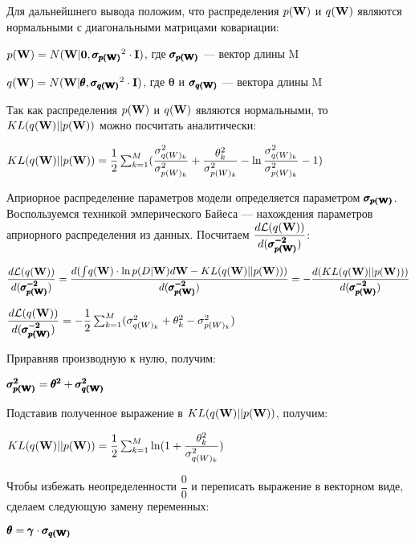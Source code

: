 \documentclass{article}
\begin{document}
Для дальнейшнего вывода положим, что распределения $p(\bold{W})$ и $q(\bold{W})$ являются нормальными с диагональными матрицами ковариации:

$p(\bold{W}) = N(\bold{W} | \bold{0}, \pmb{\sigma_{p(\bold{W})}}^{2} \cdot \bold{I})$, где $\pmb{\sigma_{p(\bold{W})}}$ — вектор длины M

$q(\bold{W}) = N(\bold{W} | \pmb{\theta}, \pmb{\sigma_{q(\bold{W})}}^{2} \cdot \bold{I})$, где $\pmb{\theta}$ и $\pmb{\sigma_{q(\bold{W})}}$ — вектора длины M

Так как распределения $p(\bold{W})$ и $q(\bold{W})$ являются нормальными, то $KL(q(\bold{W}) || p(\bold{W}))$ можно посчитать аналитически:

$
KL(q(\bold{W}) || p(\bold{W})) = 
\dfrac{1}{2}\sum_{k=1}^{M}(\dfrac{\sigma_{{q(W)_{k}}}^2}{\sigma_{{p(W)_{k}}}^2} + \dfrac{\theta_{k}^2}{\sigma_{{p(W)_{k}}}^2} - \ln{\dfrac{\sigma_{{q(W)_{k}}}^2}{\sigma_{{p(W)_{k}}}^2}} - 1)
$

Априорное распределение параметров модели определяется параметром $\pmb{\sigma_{p(\bold{W})}}$. Воспользуемся техникой эмперического Байеса — нахождения параметров априорного распределения из данных. Посчитаем
$\dfrac{d\mathcal{L}(q(\bold{W}))}{d ({\pmb{\sigma_{p(\bold{W})}^{-2}}})}$:

$
\dfrac{d\mathcal{L}(q(\bold{W}))}{d ({\pmb{\sigma_{p(\bold{W})}^{-2}}})} =
\dfrac{d (\int_{}{} q(\bold{W}) \cdot \ln{p(D | \bold{W})} d\bold{W} - KL(q(\bold{W}) || p(\bold{W})))}{d ({\pmb{\sigma_{p(\bold{W})}^{-2}}})} =
- \dfrac{d (KL(q(\bold{W}) || p(\bold{W})))}{d ({\pmb{\sigma_{p(\bold{W})}^{-2}}})}$

$
\dfrac{d\mathcal{L}(q(\bold{W}))}{d ({\pmb{\sigma_{p(\bold{W})}^{-2}}})} =
-\dfrac{1}{2}\sum_{k=1}^{M}(\sigma_{{q(W)_{k}}}^2 + \theta_{k}^2 - \sigma_{{p(W)_{k}}}^2)
$

Приравняв производную к нулю, получим:

$\pmb{\sigma_{p(\bold{W})}^{2}} = \pmb{\theta^{2}} + \pmb{\sigma_{q(\bold{W})}^{2}}$

Подставив полученное выражение в $KL(q(\bold{W}) || p(\bold{W}))$, получим:

$
KL(q(\bold{W}) || p(\bold{W})) = 
\dfrac{1}{2}\sum_{k=1}^{M}\ln({1 + \dfrac{\theta_{k}^2}{\sigma_{{q(W)_{k}}}^2}})
$

Чтобы избежать неопределенности $\dfrac{0}{0}$ и переписать выражение в векторном виде, сделаем следующую замену переменных:

$\pmb{\theta} = \pmb{\gamma} \cdot \pmb{\sigma_{q(\bold{W})}}$
\end{document}
